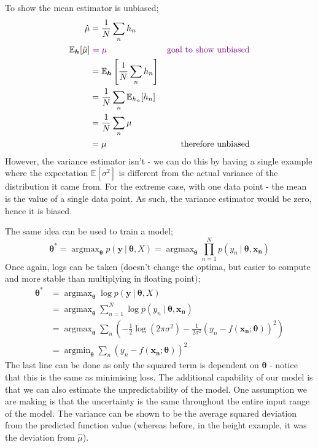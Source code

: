 \documentclass[a4paper, 12pt]{article}
\newcommand{\summation}[2]{\sum\limits_{#1}^{#2}}
\newcommand{\product}[2]{\prod\limits_{#1}^{#2}}
\renewcommand{\vec}[1]{\boldsymbol{#1}}
\DeclareMathOperator*{\argmax}{argmax}
\DeclareMathOperator*{\argmin}{argmin}
\newcommand{\violet}[1]{\textcolor{violet}{#1}}
\begin{document}
            To show the mean estimator is unbiased;
            \begin{align}
                \hat{\mu} & = \frac{1}{N} \summation{n}{} h_n \\
                \mathbb{E}_{\vec{h}}[\hat{\mu}] &\ \violet{= \mu} & \text{\violet{goal to show unbiased}}\\
                & = \mathbb{E}_{\vec{h}}\left[\frac{1}{N} \summation{n}{} h_n\right] \\
                & = \frac{1}{N} \summation{n}{} \mathbb{E}_{h_n}[h_n] \\
                & = \frac{1}{N} \summation{n}{} \mu \\
                & = \mu & \text{therefore unbiased}
            \end{align}
            However, the variance estimator isn't - we can do this by having a single example where the expectation $\mathbb{E}[\sigma^2]$ is different from the actual variance of the distribution it came from.
            For the extreme case, with one data point - the mean is the value of a single data point.
            As such, the variance estimator would be zero, hence it is biased.
            \medskip

            The same idea can be used to train a model;
            $$\vec{\theta^*} = \argmax_{\vec{\theta}} p(\vec{y}\ |\ \vec{\theta}, X) = \argmax_{\vec{\theta}} \product{n = 1}{N} p(y_n\ |\ \vec{\theta}, \vec{x_n})$$
            Once again, logs can be taken (doesn't change the optima, but easier to compute and more stable than multiplying in floating point);
            \begin{align*}
                \vec{\theta^*}  & = \argmax_{\vec{\theta}} \log p(\vec{y}\ |\ \vec{\theta}, X) \\
                & = \argmax_{\vec{\theta}} \summation{n = 1}{N} \log p(y_n\ |\ \vec{\theta}, \vec{x_n}) \\
                & = \argmax_{\vec{\theta}} \summation{n}{} \left(-\frac{1}{2} \log (2\pi\sigma^2) - \frac{1}{2\sigma^2} (y_n - f(\vec{x_n}; \vec{\theta}))^2\right) \\
                & = \argmin_{\vec{\theta}} \summation{n}{} (y_n - f(\vec{x_n}; \vec{\theta}))^2
            \end{align*}
            The last line can be done as only the squared term is dependent on $\vec{\theta}$ - notice that this is the same as minimising loss.
            The additional capability of our model is that we can also estimate the unpredictability of the model.
            One assumption we are making is that the uncertainty is the same throughout the entire input range of the model.
            The variance can be shown to be the average squared deviation from the predicted function value (whereas before, in the height example, it was the deviation from $\hat{\mu}$).
            \medskip
\end{document}
